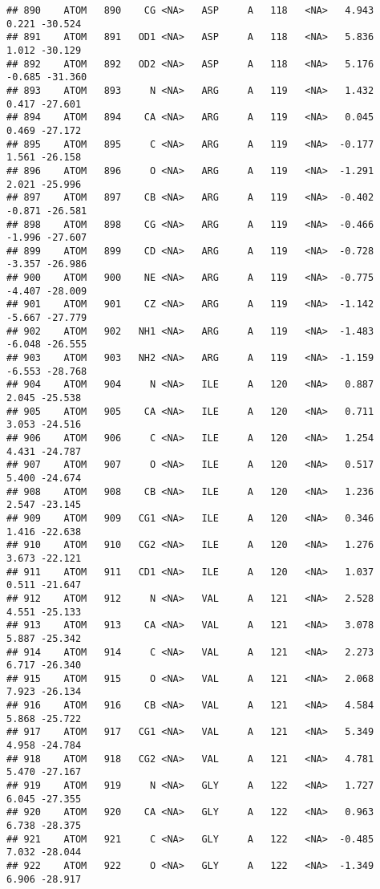 \documentclass[
]{article}
\begin{document}
\begin{verbatim}
## 890    ATOM   890    CG <NA>   ASP     A   118   <NA>   4.943   0.221 -30.524
## 891    ATOM   891   OD1 <NA>   ASP     A   118   <NA>   5.836   1.012 -30.129
## 892    ATOM   892   OD2 <NA>   ASP     A   118   <NA>   5.176  -0.685 -31.360
## 893    ATOM   893     N <NA>   ARG     A   119   <NA>   1.432   0.417 -27.601
## 894    ATOM   894    CA <NA>   ARG     A   119   <NA>   0.045   0.469 -27.172
## 895    ATOM   895     C <NA>   ARG     A   119   <NA>  -0.177   1.561 -26.158
## 896    ATOM   896     O <NA>   ARG     A   119   <NA>  -1.291   2.021 -25.996
## 897    ATOM   897    CB <NA>   ARG     A   119   <NA>  -0.402  -0.871 -26.581
## 898    ATOM   898    CG <NA>   ARG     A   119   <NA>  -0.466  -1.996 -27.607
## 899    ATOM   899    CD <NA>   ARG     A   119   <NA>  -0.728  -3.357 -26.986
## 900    ATOM   900    NE <NA>   ARG     A   119   <NA>  -0.775  -4.407 -28.009
## 901    ATOM   901    CZ <NA>   ARG     A   119   <NA>  -1.142  -5.667 -27.779
## 902    ATOM   902   NH1 <NA>   ARG     A   119   <NA>  -1.483  -6.048 -26.555
## 903    ATOM   903   NH2 <NA>   ARG     A   119   <NA>  -1.159  -6.553 -28.768
## 904    ATOM   904     N <NA>   ILE     A   120   <NA>   0.887   2.045 -25.538
## 905    ATOM   905    CA <NA>   ILE     A   120   <NA>   0.711   3.053 -24.516
## 906    ATOM   906     C <NA>   ILE     A   120   <NA>   1.254   4.431 -24.787
## 907    ATOM   907     O <NA>   ILE     A   120   <NA>   0.517   5.400 -24.674
## 908    ATOM   908    CB <NA>   ILE     A   120   <NA>   1.236   2.547 -23.145
## 909    ATOM   909   CG1 <NA>   ILE     A   120   <NA>   0.346   1.416 -22.638
## 910    ATOM   910   CG2 <NA>   ILE     A   120   <NA>   1.276   3.673 -22.121
## 911    ATOM   911   CD1 <NA>   ILE     A   120   <NA>   1.037   0.511 -21.647
## 912    ATOM   912     N <NA>   VAL     A   121   <NA>   2.528   4.551 -25.133
## 913    ATOM   913    CA <NA>   VAL     A   121   <NA>   3.078   5.887 -25.342
## 914    ATOM   914     C <NA>   VAL     A   121   <NA>   2.273   6.717 -26.340
## 915    ATOM   915     O <NA>   VAL     A   121   <NA>   2.068   7.923 -26.134
## 916    ATOM   916    CB <NA>   VAL     A   121   <NA>   4.584   5.868 -25.722
## 917    ATOM   917   CG1 <NA>   VAL     A   121   <NA>   5.349   4.958 -24.784
## 918    ATOM   918   CG2 <NA>   VAL     A   121   <NA>   4.781   5.470 -27.167
## 919    ATOM   919     N <NA>   GLY     A   122   <NA>   1.727   6.045 -27.355
## 920    ATOM   920    CA <NA>   GLY     A   122   <NA>   0.963   6.738 -28.375
## 921    ATOM   921     C <NA>   GLY     A   122   <NA>  -0.485   7.032 -28.044
## 922    ATOM   922     O <NA>   GLY     A   122   <NA>  -1.349   6.906 -28.917

\end{verbatim}
\end{document}
